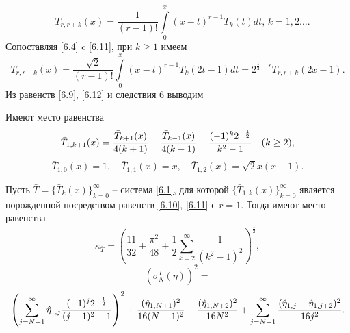   \begin{equation}\label{6.11}
\quad \bar T_{r,r+k}(x) =\frac{1}{(r-1)!}\int\limits_{0}^x(x-t)^{r-1}\bar T_k(t)dt, \, k=1,2\ldots.
\end{equation}
Сопоставляя \eqref{6.4} c \eqref{6.11}, при $k\ge1$ имеем
\begin{equation}\label{6.12}
\bar T_{r,r+k}(x) =\frac{\sqrt{2}}{(r-1)!}\int\limits_{0}^x(x-t)^{r-1}T_k(2t-1)dt=2^{\frac12-r}T_{r,r+k}(2x-1).
\end{equation}
Из равенств  \eqref{6.9}, \eqref{6.12} и следствия 6 выводим
\begin{corollary} Имеют место равенства
\begin{equation}\label{6.13}
\bar T_{1,k+1}(x)={\bar T_{k+1}(x)\over4(k+1)}- {\bar T_{k-1}(x)\over4(k-1)} -\frac{(-1)^k2^{-\frac12}}{k^2-1}\quad (k\ge 2),
\end{equation}
\begin{equation}\label{6.14}
\bar T_{1,0}(x)=1, \quad \bar T_{1,1}(x)=x, \quad \bar T_{1,2}(x)=\sqrt{2}x(x-1).
\end{equation}
\end{corollary}
\begin{theorem}
  Пусть $\bar T=\{\bar T_k(x)\}_{k=0}^\infty$ -- система  \eqref{6.1}, для которой  $\{\bar T_{1,k}(x)\}_{k=0}^\infty$  является порожденной посредством равенств \eqref{6.10}, \eqref{6.11} с $r=1$. Тогда   имеют место равенства
 $$
\kappa_{\bar T}=\left(\frac{11}{32}+\frac{\pi^2}{48}+\frac12\sum_{k=2}^\infty\frac{1}{(k^2-1)^2}\right)^\frac12,
$$
$$
(\sigma^{\bar T}_N(\eta))^2=
$$
$$
\left(\sum_{j=N+1}^{\infty}\hat\eta_{1,j}\frac{(-1)^j2^{-\frac12}}{(j-1)^2-1}\right)^2+
{(\hat\eta_{1,N+1})^2\over16(N-1)^2} +{(\hat\eta_{1,N+2})^2\over16N^2}
+\sum_{j=N+1}^{\infty}\frac{(\hat\eta_{1,j}-\hat\eta_{1,j+2})^2}{16j^2}.
$$
\end{theorem}
